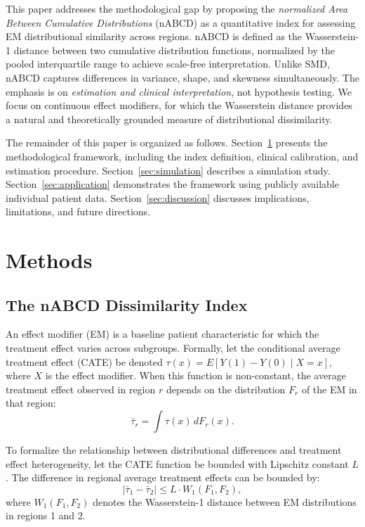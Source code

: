 \documentclass[AMA,Times1COL]{WileyNJDv5}
\begin{document}
This paper addresses the methodological gap by proposing the \emph{normalized Area Between Cumulative Distributions} (nABCD) as a quantitative index for assessing EM distributional similarity across regions. nABCD is defined as the Wasserstein-1 distance between two cumulative distribution functions, normalized by the pooled interquartile range to achieve scale-free interpretation. Unlike SMD, nABCD captures differences in variance, shape, and skewness simultaneously. The emphasis is on \emph{estimation and clinical interpretation}, not hypothesis testing. We focus on continuous effect modifiers, for which the Wasserstein distance provides a natural and theoretically grounded measure of distributional dissimilarity.

The remainder of this paper is organized as follows. Section~\ref{sec:methods} presents the methodological framework, including the index definition, clinical calibration, and estimation procedure. Section~\ref{sec:simulation} describes a simulation study. Section~\ref{sec:application} demonstrates the framework using publicly available individual patient data. Section~\ref{sec:discussion} discusses implications, limitations, and future directions.

\section{Methods}\label{sec:methods}

\subsection{The nABCD Dissimilarity Index}\label{sec:nabcd_metric}

An effect modifier (EM) is a baseline patient characteristic for which the treatment effect varies across subgroups. Formally, let the conditional average treatment effect (CATE) be denoted $\tau(x) = E[Y(1) - Y(0) \mid X = x]$, where $X$ is the effect modifier. When this function is non-constant, the average treatment effect observed in region $r$ depends on the distribution $F_r$ of the EM in that region:
\begin{equation}
\bar{\tau}_r = \int \tau(x) \, dF_r(x).
\label{eq:regional_ate}
\end{equation}

To formalize the relationship between distributional differences and treatment effect heterogeneity, let the CATE function be bounded with Lipschitz constant $L$. The difference in regional average treatment effects can be bounded by:
\begin{equation}
|\bar{\tau}_1 - \bar{\tau}_2| \leq L \cdot W_1(F_1, F_2),
\label{eq:heterogeneity_bound}
\end{equation}
where $W_1(F_1, F_2)$ denotes the Wasserstein-1 distance between EM distributions in regions 1 and 2.
\end{document}

